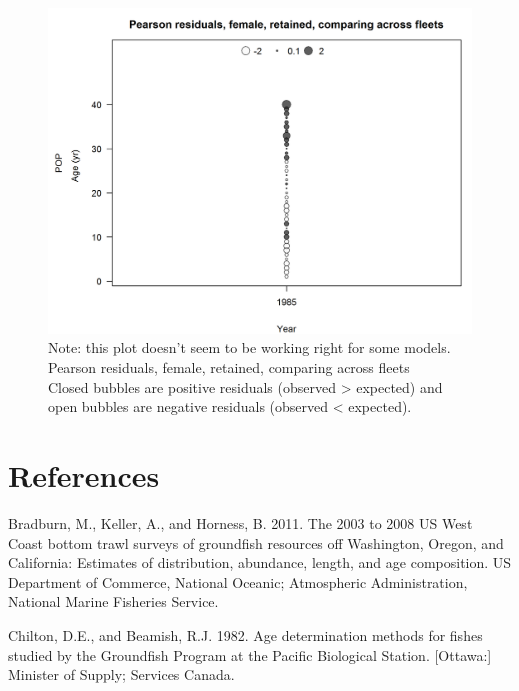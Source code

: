 \documentclass[12pt,]{article}
\begin{document}
\begin{figure}
\centering
\includegraphics{./r4ss/plots_mod1/comp_agefit_sex2mkt2_multi-fleet_comparison.png}
\caption{Note: this plot doesn't seem to be working right for some
models. Pearson residuals, female, retained, comparing across fleets\\
Closed bubbles are positive residuals (observed \textgreater{} expected)
and open bubbles are negative residuals (observed \textless{} expected).
\label{fig:age_fits}}
\end{figure}

\FloatBarrier
\newpage

\color{black}

\section{References}\label{references}

\renewcommand{\thepage}{}

\hypertarget{refs}{}
\hypertarget{ref-bradburn_2003_2011}{}
Bradburn, M., Keller, A., and Horness, B. 2011. The 2003 to 2008 US West
Coast bottom trawl surveys of groundfish resources off Washington,
Oregon, and California: Estimates of distribution, abundance, length,
and age composition. US Department of Commerce, National Oceanic;
Atmospheric Administration, National Marine Fisheries Service.

\hypertarget{ref-chilton_age_1982}{}
Chilton, D.E., and Beamish, R.J. 1982. Age determination methods for
fishes studied by the Groundfish Program at the Pacific Biological
Station. {[}Ottawa:{]} Minister of Supply; Services Canada.
\end{document}
